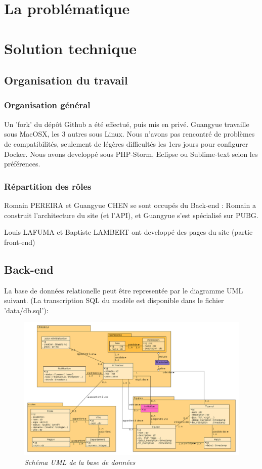 \documentclass[10pt]{article}
\begin{document}
  \newpage
  \section{La problématique}
  
  \newpage
  \section{Solution technique}
    \subsection{Organisation du travail}
      \subsubsection{Organisation général}
	Un 'fork' du dépôt Github a été effectué, puis mis en privé. Guangyue travaille sous MacOSX, les 3 autres sous Linux.
	Nous n'avons pas rencontré de problèmes de compatibilités, seulement de légères difficultés les 1ers jours pour configurer Docker.
	Nous avons developpé sous PHP-Storm, Eclipse ou Sublime-text selon les préférences.
      \subsubsection{Répartition des rôles}
	Romain PEREIRA et Guangyue CHEN se sont occupés du Back-end : Romain a construit l'architecture du site (et l'API), et Guangyue s'est spécialisé sur PUBG.
	
	Louis LAFUMA et Baptiste LAMBERT ont developpé des pages du site (partie front-end)
    \subsection{Back-end}
      La base de données relationelle peut être representée par le diagramme UML suivant.
      \newline
      (La transcription SQL du modèle est disponible dans le fichier 'data/db.sql'):
      \begin{figure}[H]
	\begin{center}
	  \includegraphics[width=17.5cm,keepaspectratio]{./images/uml.png}
	\end{center}
	\caption{\textit{Schéma UML de la base de données}}
	\label{uml}
      \end{figure}
      
\end{document}
